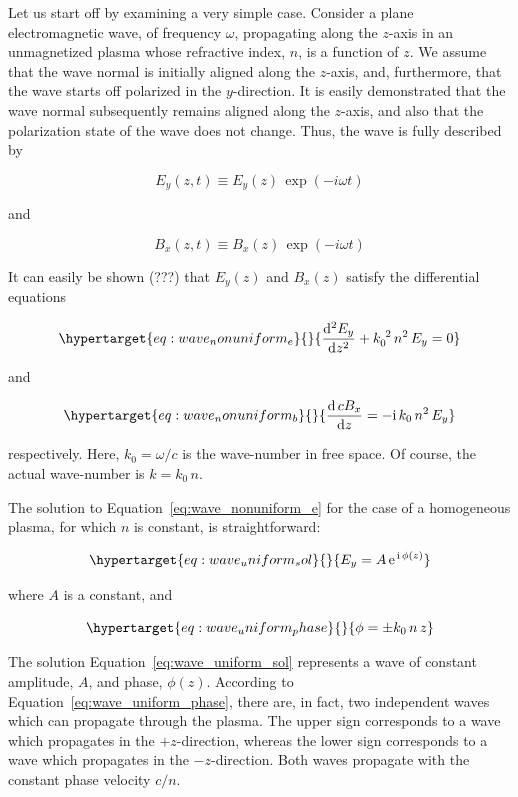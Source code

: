 \documentclass[
  notoc %
]{tufte-book}
\begin{document}
Let us start off by examining a very simple case. Consider a plane
electromagnetic wave, of frequency \(\omega\), propagating along the
\(z\)-axis in an unmagnetized plasma whose refractive index, \(n\), is a
function of \(z\). We assume that the wave normal is initially aligned
along the \(z\)-axis, and, furthermore, that the wave starts off
polarized in the \(y\)-direction. It is easily demonstrated that the
wave normal subsequently remains aligned along the \(z\)-axis, and also
that the polarization state of the wave does not change. Thus, the wave
is fully described by

\[
E_y(z,t) \equiv E_y(z)\,\exp(-i\omega t)
\]

and

\[
B_x(z,t) \equiv B_x(z)\,\exp(-i\omega t)
\]

It can easily be shown (???) that \(E_y(z)\) and \(B_x(z)\) satisfy the
differential equations

\begin{equation}\protect\hypertarget{eq:wave_nonuniform_e}{}{
\frac{\mathrm{d}^2 E_y}{\mathrm{d}z^2} + k_0^{~2}\,n^2\,E_y = 0
}\label{eq:wave_nonuniform_e}\end{equation}

and

\begin{equation}\protect\hypertarget{eq:wave_nonuniform_b}{}{
\frac{\mathrm{d}\,cB_x}{\mathrm{d}z} = -{\rm i}\,k_0\,n^2\,E_y
}\label{eq:wave_nonuniform_b}\end{equation}

respectively. Here, \(k_0=\omega/c\) is the wave-number in free space.
Of course, the actual wave-number is \(k=k_0\,n\).

The solution to Equation~\ref{eq:wave_nonuniform_e} for the case of a
homogeneous plasma, for which \(n\) is constant, is straightforward:

\begin{equation}\protect\hypertarget{eq:wave_uniform_sol}{}{
E_y = A\,{\rm e}^{\,{\rm i}\,\phi(z)}
}\label{eq:wave_uniform_sol}\end{equation}

where \(A\) is a constant, and

\begin{equation}\protect\hypertarget{eq:wave_uniform_phase}{}{
\phi = \pm k_0\,n\,z
}\label{eq:wave_uniform_phase}\end{equation}

The solution Equation~\ref{eq:wave_uniform_sol} represents a wave of
constant amplitude, \(A\), and phase, \(\phi(z)\). According to
Equation~\ref{eq:wave_uniform_phase}, there are, in fact, two
independent waves which can propagate through the plasma. The upper sign
corresponds to a wave which propagates in the \(+z\)-direction, whereas
the lower sign corresponds to a wave which propagates in the
\(-z\)-direction. Both waves propagate with the constant phase velocity
\(c/n\).
\end{document}
